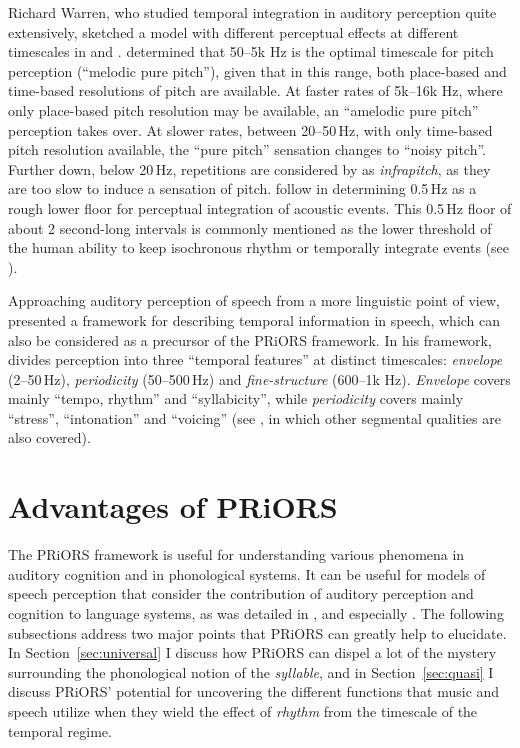 \begin{sloppypar}
Richard Warren, who studied temporal integration in auditory perception quite extensively, sketched a model with different perceptual effects at different timescales in \citet{warren1981perception} and \citet[80--85]{warren1982auditory}. \citet{warren1981perception} determined that 50--5k Hz is the optimal timescale for pitch perception (\enquote{melodic pure pitch}), given that in this range, both place-based and time-based resolutions of pitch are available.
At faster rates of 5k--16k Hz, where only place-based pitch resolution may be available, an \enquote{amelodic pure pitch} perception takes over.
At slower rates, between 20--50\,Hz, with only time-based pitch resolution available, the \enquote{pure pitch} sensation changes to \enquote{noisy pitch}. Further down, below 20\,Hz, repetitions are considered by \citet{warren1981perception} as \emph{infrapitch}, as they are too slow to induce a sensation of pitch.
\citet{warren1981perception} follow \citet{guttman1963lower} in determining 0.5\,Hz as a rough lower floor for perceptual integration of acoustic events. This 0.5\,Hz floor of about 2 second-long intervals is commonly mentioned as the lower threshold of the human ability to keep isochronous rhythm or temporally integrate events (see \citealt{fraisse1984perception, farbood2013temporal, repp2005sensorimotor}).
\end{sloppypar}

Approaching auditory perception of speech from a more linguistic point of view, \citet{rosen1992temporal} presented a framework for describing temporal information in speech, which can also be considered as a precursor of the PRiORS framework.
In his framework, \citet{rosen1992temporal} divides perception into three \enquote{temporal features} at distinct timescales: \emph{envelope} (2--50\,Hz), \emph{periodicity} (50--500\,Hz) and \emph{fine-structure} (600--1k Hz). \emph{Envelope} covers mainly \enquote{tempo, rhythm} and \enquote{syllabicity}, while \emph{periodicity} covers mainly \enquote{stress}, \enquote{intonation} and \enquote{voicing} (see \cite[76]{rosen1992temporal}, in which other segmental qualities are also covered).

\section{Advantages of PRiORS}\label{advantages-of-priors}

The PRiORS framework is useful for understanding various phenomena in auditory cognition and in phonological systems. It can be useful for models of speech perception that consider the contribution of auditory perception and cognition to language systems, as was detailed in , and especially .
The following subsections address two major points that PRiORS can greatly help to elucidate. In Section~\ref{sec:universal} I discuss how PRiORS can dispel a lot of the mystery surrounding the phonological notion of the \emph{syllable}, and in Section~\ref{sec:quasi} I discuss PRiORS' potential for uncovering the different functions that music and speech utilize when they wield the effect of \emph{rhythm} from the timescale of the temporal regime.

